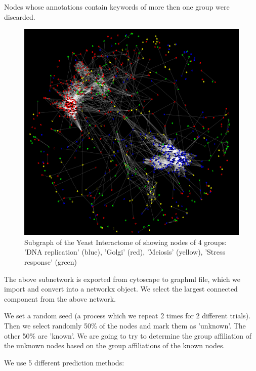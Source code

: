 \documentclass[a4paper,10pt]{article}
\theoremstyle{definition}
\theoremstyle{remark}
\theoremstyle{plain}
\begin{document}
Nodes whose annotations contain keywords of more then one group were discarded.

\begin{figure}
\centering
\includegraphics[width=\textwidth]{yeastsubgraph_4_groups_colorcode.png}
\caption{Subgraph of the Yeast Interactome of showing nodes of 4 groups: 'DNA
replication' (blue), 'Golgi' (red), 'Meiosis' (yellow), 'Stress response'
(green)}
\label{fig:yeast_subgraph_4groups}
\end{figure}

The above subnetwork is exported from cytoscape to graphml file, which we import 
and convert into a networkx object. 
We select the largest connected component from the above network.

We set a random seed (a process which we repeat 2 times for 2 different trials).
Then we select randomly 50\% of the nodes and mark them as 'unknown'. The other
50\% are 'known'. We are going to try to determine the group affiliation of the
unknown nodes based on the group affiliations of the known nodes.

We use 5 different prediction methods:
\end{document}
